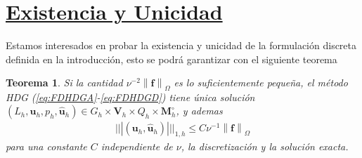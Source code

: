 \documentclass[10pt,a4paper]{report}
\newtheorem{teo}{Teorema}
\newcommand{\bs}{\boldsymbol}
\providecommand{\norm}[1]{\left\lVert#1\right\rVert}
\begin{document}
   \section*{\underline{Existencia y Unicidad}}
    Estamos interesados en probar la existencia y unicidad de la formulación discreta definida en la introducción, esto se podrá garantizar con el siguiente teorema
    \begin{teo}\label{teo2}
    	Si la cantidad $\nu^{-2}\norm{\bs{f}}_{\Omega}$ es lo suficientemente pequeña, el método HDG (\ref*{eq:FDHDGA}-\ref*{eq:FDHDGD}) tiene única solución $\left(L_{h},\bs{u}_{h},p_{h},\bs{\hat{u}}_{h}\right)\in G_{h}\times\bs{V}_{h}\times Q_{h}\times \bs{M}^{\circ}_{h}$, y ademas
    	\begin{align*}
    		||| \left(\bs{u}_{h},\bs{\hat{u}}_{h}\right) |||_{1,h} \leq C\nu^{-1}\norm{\bs{f}}_{\Omega}
    	\end{align*}
        para una constante $C$ independiente de $\nu$, la discretización y la solución exacta.
    \end{teo}
\end{document}
